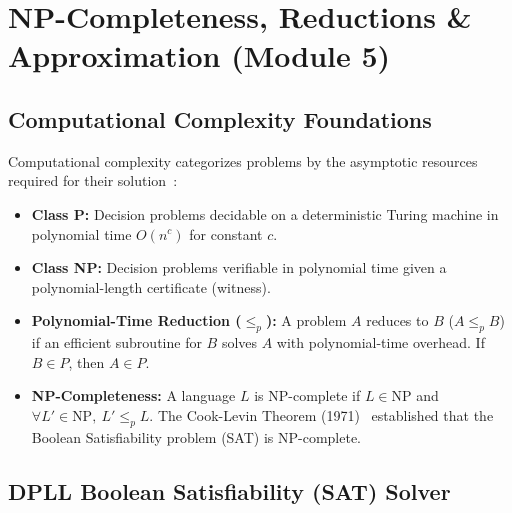 \chapter{NP-Completeness, Reductions \& Approximation (Module 5)}
\label{ch:np_completeness}

\section{Computational Complexity Foundations}
Computational complexity categorizes problems by the asymptotic resources required for their solution~\cite{clrs2009,karp1972}:
\begin{itemize}
    \item \textbf{Class P:} Decision problems decidable on a deterministic Turing machine in polynomial time $O(n^c)$ for constant $c$.
    \item \textbf{Class NP:} Decision problems verifiable in polynomial time given a polynomial-length certificate (witness).
    \item \textbf{Polynomial-Time Reduction ($\le_p$):} A problem $A$ reduces to $B$ ($A \le_p B$) if an efficient subroutine for $B$ solves $A$ with polynomial-time overhead. If $B \in P$, then $A \in P$.
    \item \textbf{NP-Completeness:} A language $L$ is NP-complete if $L \in \text{NP}$ and $\forall L' \in \text{NP}, \ L' \le_p L$. The Cook-Levin Theorem (1971)~\cite{cook1971} established that the Boolean Satisfiability problem (SAT) is NP-complete.
\end{itemize}

\section{DPLL Boolean Satisfiability (SAT) Solver}
